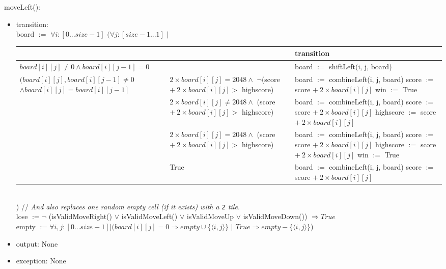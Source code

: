 \documentclass[12pt]{article}
\begin{document}
\noindent moveLeft():
\begin{itemize}
\item transition:\\ 
board $:=$ $\forall i : [0...size-1]$ $(\forall j : [size-1...1]$ $|$
\begin{table}[hbt!]
\centering
\begin{tabular}{|l|l|l|}
\cline{3-3}
\multicolumn{1}{l}{} &  & transition \\
\hline
\multicolumn{2}{|l|}{$board[i][j] \ne 0 \land board[i][j-1] = 0$} & board $:=$ shiftLeft(i, j, board)\\
\hline
\shortstack{$(board[i][j], board[i][j-1] \ne 0$ \\$\land board[i][j] = board[i][j-1]$} & \shortstack{$2\times board[i][j] = 2048 \land$ \\ $\neg$(score $+ \: 2\times board[i][j] > $ highscore) } & \shortstack{board $:=$ combineLeft(i, j, board)\\ score $:=$ score $+\: 2\times board[i][j]$\\ win $:=$ True}\\
\cline{2-3}
 & \shortstack{$2\times board[i][j] \ne 2048 \land$ \\ (score $+ \: 2\times board[i][j] > $ highscore) } & \shortstack{board $:=$ combineLeft(i, j, board)\\ score $:=$ score $+\: 2\times board[i][j]$\\ highscore $:=$ score $+\: 2\times board[i][j]$}\\
\cline{2-3}
  & \shortstack{$2\times board[i][j] = 2048 \land$ \\ (score $+ \: 2\times board[i][j] > $ highscore) }  & \shortstack{board $:=$ combineLeft(i, j, board)\\ score $:=$ score $+\: 2\times board[i][j]$\\ highscore $:=$ score $+\: 2\times board[i][j]$\\ win $:=$ True}\\
\cline{2-3}
  & True & \shortstack{board $:=$ combineLeft(i, j, board)\\ score $:=$ score $+\: 2\times board[i][j]$}\\
\hline
\end{tabular}
\end{table}
\\
) // \textit{And also replaces one random empty cell (if it exists) with a \texttt{2} tile.}\\
lose $:= \neg$ (isValidMoveRight() $\lor$ isValidMoveLeft() $\lor$ isValidMoveUp $\lor$ isValidMoveDown()) $\Rightarrow True$\\
empty $:= \forall i, j : [0...size-1] | (board[i][j] = 0 \Rightarrow empty \cup \{\langle i, j \rangle\}$ $|$ $True \Rightarrow empty - \{\langle i, j \rangle\}$)
\item output: None
\item exception: None
\end{itemize}
\end{document}
